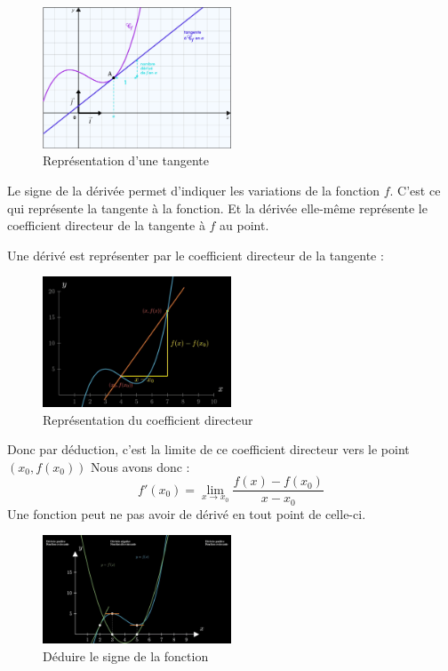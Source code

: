 \documentclass[12]{article}%
\theoremstyle{plain}
\theoremstyle{definition}
\theoremstyle{remark}
\begin{document}
\begin{figure}[h] %
	\centering
	\includegraphics[width=0.5\textwidth]{./images/tangente.png} %
	\caption{Représentation d'une tangente}
	\label{fig:tangente} %
\end{figure}

Le signe de la dérivée permet d’indiquer les variations de la fonction $f$. C’est ce qui représente la tangente à la fonction. Et la dérivée elle-même représente le coefficient directeur de la tangente à $f$ au point. \newline

Une dérivé est représenter par le coefficient directeur de la tangente :
\begin{figure}[h] %
	\centering
	\includegraphics[width=0.5\textwidth]{./images/coef_directeur.png} %
	\caption{Représentation du coefficient directeur}
	\label{fig:coef_directeur} %
\end{figure}

Donc par déduction, c'est la limite de ce coefficient directeur vers le point $(x_{0}, f(x_{0}))$ \newline
Nous avons donc :
\[
\boxed{ f'(x_{0}) = \lim\limits_{x \to x_{0}} \frac{f(x)-f(x_{0})}{x-x_{0}} }
\]
Une fonction peut ne pas avoir de dérivé en tout point de celle-ci.\newline


\begin{figure}[H] %
	\centering
	\includegraphics[width=0.5\textwidth]{./images/variations.png} %
	\caption{Déduire le signe de la fonction}
	\label{fig:variations} %
\end{figure}
\end{document}
